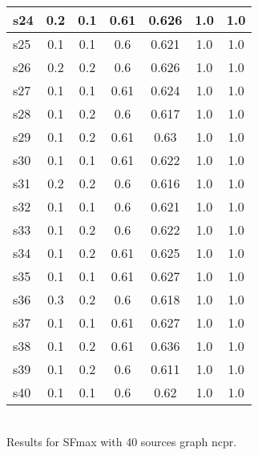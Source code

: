 \documentclass{article}
\begin{document}
\begin{tabular}{|l|c|c|c|c|c|c|}
\hline
s24 &0.2 & 0.1 & 0.61 & 0.626 & 1.0 & 1.0\\
\hline
s25 &0.1 & 0.1 & 0.6 & 0.621 & 1.0 & 1.0\\
\hline
s26 &0.2 & 0.2 & 0.6 & 0.626 & 1.0 & 1.0\\
\hline
s27 &0.1 & 0.1 & 0.61 & 0.624 & 1.0 & 1.0\\
\hline
s28 &0.1 & 0.2 & 0.6 & 0.617 & 1.0 & 1.0\\
\hline
s29 &0.1 & 0.2 & 0.61 & 0.63 & 1.0 & 1.0\\
\hline
s30 &0.1 & 0.1 & 0.61 & 0.622 & 1.0 & 1.0\\
\hline
s31 &0.2 & 0.2 & 0.6 & 0.616 & 1.0 & 1.0\\
\hline
s32 &0.1 & 0.1 & 0.6 & 0.621 & 1.0 & 1.0\\
\hline
s33 &0.1 & 0.2 & 0.6 & 0.622 & 1.0 & 1.0\\
\hline
s34 &0.1 & 0.2 & 0.61 & 0.625 & 1.0 & 1.0\\
\hline
s35 &0.1 & 0.1 & 0.61 & 0.627 & 1.0 & 1.0\\
\hline
s36 &0.3 & 0.2 & 0.6 & 0.618 & 1.0 & 1.0\\
\hline
s37 &0.1 & 0.1 & 0.61 & 0.627 & 1.0 & 1.0\\
\hline
s38 &0.1 & 0.2 & 0.61 & 0.636 & 1.0 & 1.0\\
\hline
s39 &0.1 & 0.2 & 0.6 & 0.611 & 1.0 & 1.0\\
\hline
s40 &0.1 & 0.1 & 0.6 & 0.62 & 1.0 & 1.0\\
\hline
\end{tabular}\\

\noindent Results for SFmax with 40 sources graph ncpr.
\end{document}

